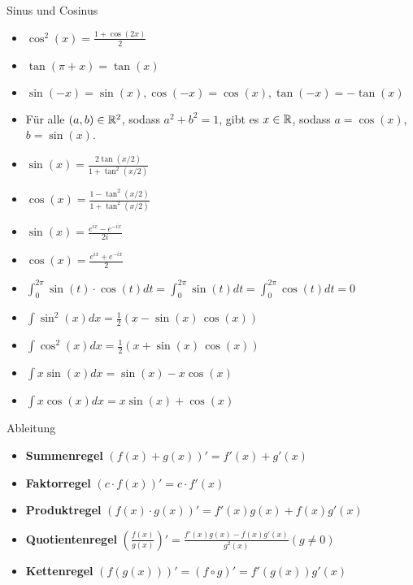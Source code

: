 \begin{Rechenregeln}{Sinus und Cosinus}{}
\begin{itemize}
    \item $\cos^2(x) = \frac{1+\cos(2x)}{2}$
    \item $\tan(\pi + x) = \tan(x)$
    \item $\sin(-x) = \sin(x), \cos(-x) = \cos(x), \tan(-x) = -\tan(x)$
    \item Für alle $(a,b)\in \mathbb{R}^2$, sodass $a^2+b^2 = 1$, gibt es $x\in\mathbb{R}$, sodass $a = \cos(x)$, $b = \sin(x)$.
    \item $\sin(x) = \frac{2\tan(x/2)}{1+\tan^2(x/2)}$
    \item $\cos(x) = \frac{1-\tan^2(x/2)}{1+\tan^2(x/2)}$
    \item $\sin(x) = \frac{e^{ix} - e^{-ix}}{2i}$
    \item $\cos(x) = \frac{e^{ix} + e^{-ix}}{2}$
    \item $\int_0^{2\pi} \sin(t)\cdot \cos(t) dt = \int_0^{2\pi} \sin(t) dt = \int_0^{2\pi} \cos(t) dt = 0$
    \item $\int \sin^2(x) dx = \frac{1}{2} (x-\sin(x) \, \cos(x))$
    \item $\int \cos^2(x) dx = \frac{1}{2} (x+\sin(x) \, \cos(x))$
    \item $\int x \sin(x) dx = \sin (x)-x \cos (x)$
    \item $\int x \cos(x) dx = x \sin (x)+\cos (x)$
    \end{itemize}
\end{Rechenregeln}

\begin{Rechenregeln}{Ableitung}{}
    \begin{itemize}
        \item \textbf{Summenregel} $(f(x)+g(x))' = f'(x) + g'(x)$
        \item \textbf{Faktorregel} $(c\cdot f(x))' = c\cdot f'(x)$
        \item \textbf{Produktregel} $(f(x)\cdot g(x))' = f'(x)g(x) + f(x)g'(x)$
        \item \textbf{Quotientenregel} $\left(\frac{f(x)}{g(x)}\right)' = \frac{f'(x)g(x) - f(x)g'(x)}{g^2(x)}(g\neq 0)$
        \item \textbf{Kettenregel} $(f(g(x)))' = (f\circ g)' = f'(g(x))g'(x)$
    \end{itemize}
\end{Rechenregeln}

